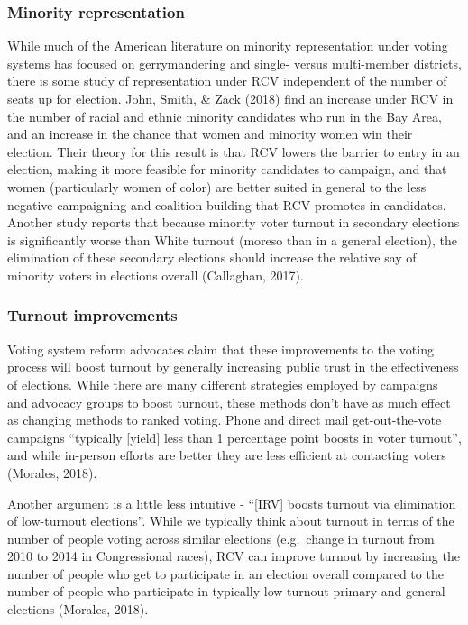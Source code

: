\documentclass[12pt,twoside]{reedthesis}
\begin{document}
\hypertarget{minority-representation}{%
\subsubsection{Minority representation}\label{minority-representation}}

While much of the American literature on minority representation under voting systems has focused on gerrymandering and single- versus multi-member districts, there is some study of representation under RCV independent of the number of seats up for election. John, Smith, \& Zack (2018) find an increase under RCV in the number of racial and ethnic minority candidates who run in the Bay Area, and an increase in the chance that women and minority women win their election. Their theory for this result is that RCV lowers the barrier to entry in an election, making it more feasible for minority candidates to campaign, and that women (particularly women of color) are better suited in general to the less negative campaigning and coalition-building that RCV promotes in candidates. Another study reports that because minority voter turnout in secondary elections is significantly worse than White turnout (moreso than in a general election), the elimination of these secondary elections should increase the relative say of minority voters in elections overall (Callaghan, 2017).

\hypertarget{turnout-improvements}{%
\subsubsection{Turnout improvements}\label{turnout-improvements}}

Voting system reform advocates claim that these improvements to the voting process will boost turnout by generally increasing public trust in the effectiveness of elections. While there are many different strategies employed by campaigns and advocacy groups to boost turnout, these methods don't have as much effect as changing methods to ranked voting. Phone and direct mail get-out-the-vote campaigns ``typically {[}yield{]} less than 1 percentage point boosts in voter turnout'', and while in-person efforts are better they are less efficient at contacting voters (Morales, 2018).

Another argument is a little less intuitive - ``{[}IRV{]} boosts turnout via elimination of low-turnout elections''. While we typically think about turnout in terms of the number of people voting across similar elections (e.g.~change in turnout from 2010 to 2014 in Congressional races), RCV can improve turnout by increasing the number of people who get to participate in an election overall compared to the number of people who participate in typically low-turnout primary and general elections (Morales, 2018).
\end{document}
